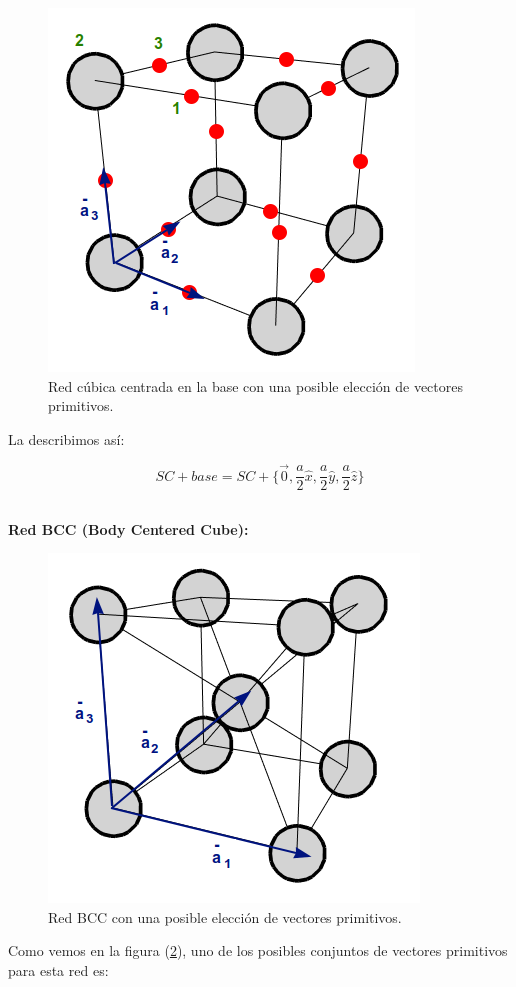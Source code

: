 \documentclass[a4paper]{article}
\begin{document}
\begin{itemize}
\begin{figure}[H]
  \centering
  \includegraphics[width=0.5\linewidth,height=0.5\linewidth]{cubo3d_ej3.png}
  \caption{Red c\'ubica centrada en la base con una posible elecci\'on de vectores primitivos.}
  \label{fig:cubo3d_ej3}
\end{figure}

La describimos as\'i:

$$SC + base = SC + \{ \vec{0}, \frac{a}{2}\hat{x}, \frac{a}{2}\hat{y}, \frac{a}{2}\hat{z}\}$$

\end{itemize}

\subsection{}

\textbf{Red BCC (Body Centered Cube):}

\begin{figure}[H]
  \centering
  \includegraphics[width=0.5\linewidth,height=0.5\linewidth]{bcc.png}
  \caption{Red BCC con una posible elecci\'on de vectores primitivos.}
  \label{fig:bcc}
\end{figure}

Como vemos en la figura (\ref{fig:bcc}), uno de los posibles conjuntos de vectores primitivos para esta red es:
\end{document}
